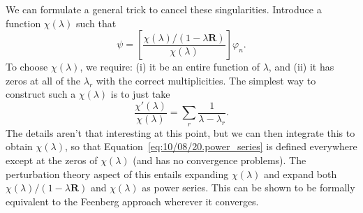 \documentclass[11pt,
        usenames, %
        dvipsnames %
    ]{report}
\newcommand*{\bm}[1]{\boldsymbol{\mathbf{#1}}}
\newcommand*{\s}[1]{\left[#1\right]}
\begin{document}
\begin{itemize}
        We can formulate a general trick to cancel these singularities.
        Introduce a function $\chi(\lambda)$ such that
        \begin{equation}
            \psi = \s{\frac{\chi(\lambda) / (1 - \lambda \bm{R})}{\chi(\lambda)
                }} \varphi_n.\label{eq:10/08/20.power_series}
        \end{equation}
        To choose $\chi(\lambda)$, we require: (i) it be an entire function of
        $\lambda$, and (ii) it has zeros at all of the $\lambda_r$ with the
        correct multiplicities. The simplest way to construct such a
        $\chi(\lambda)$ is to just take
        \begin{equation}
            \frac{\chi'(\lambda)}{\chi(\lambda)} = \sum\limits_r
                \frac{1}{\lambda - \lambda_r}.
        \end{equation}
        The details aren't that interesting at this point, but we can then
        integrate this to obtain $\chi(\lambda)$, so that
        Equation~\eqref{eq:10/08/20.power_series} is defined everywhere except
        at the zeros of $\chi(\lambda)$ (and has no convergence problems). The
        perturbation theory aspect of this entails expanding $\chi(\lambda)$ and
        expand both $\chi(\lambda) / (1 - \lambda \bm{R})$ and $\chi(\lambda)$
        as power series. This can be shown to be formally equivalent to the
        Feenberg approach wherever it converges.


\end{itemize}
\end{document}
